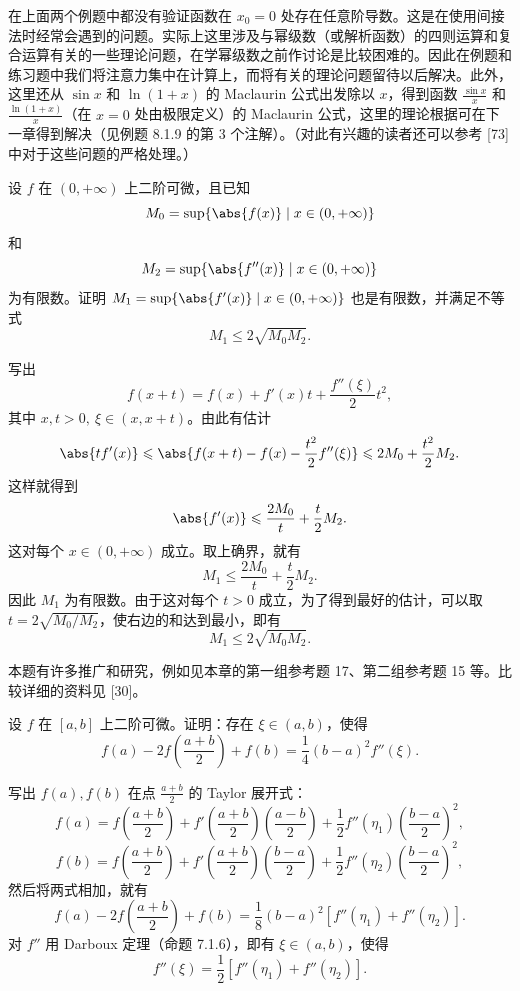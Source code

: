 \begin{xremark}
在上面两个例题中都没有验证函数在 $x_0=0$ 处存在任意阶导数。这是在使用间接法时经常会遇到的问题。实际上这里涉及与幂级数（或解析函数）的四则运算和复合运算有关的一些理论问题，在学幂级数之前作讨论是比较困难的。因此在例题和练习题中我们将注意力集中在计算上，而将有关的理论问题留待以后解决。此外，这里还从 $\sin x$ 和 $\ln(1+x)$ 的 Maclaurin 公式出发除以 $x$，得到函数 $\frac{\sin x}{x}$ 和 $\frac{\ln(1+x)}{x}$（在 $x=0$ 处由极限定义）的 Maclaurin 公式，这里的理论根据可在下一章得到解决（见例题 8.1.9 的第 3 个注解）。（对此有兴趣的读者还可以参考 [73] 中对于这些问题的严格处理。）
\end{xremark}

\begin{xexample}[7.2.5]
设 $f$ 在 $(0,+\infty)$ 上二阶可微，且已知
\[
  M_0=\sup\{\abs{f(x)}\mid x\in(0,+\infty)\}
\]
和
\[
  M_2=\sup\{\abs{f''(x)}\mid x\in(0,+\infty)\}
\]
为有限数。证明 $M_1=\sup\{\abs{f'(x)}\mid x\in(0,+\infty)\}$ 也是有限数，并满足不等式
\[
  M_1\leqslant2\sqrt{M_0M_2}.
\]
\end{xexample}
\begin{xproof}
写出
\[
  f(x+t)=f(x)+f'(x)t+\frac{f''(\xi)}{2}t^2,
\]
其中 $x,t>0,\ \xi\in(x,x+t)$。由此有估计
\[
  \abs{tf'(x)}\leqslant\abs{f(x+t)-f(x)-\frac{t^2}{2}f''(\xi)}
  \leqslant2M_0+\frac{t^2}{2}M_2.
\]
这样就得到
\[
  \abs{f'(x)}\leqslant\frac{2M_0}{t}+\frac{t}{2}M_2.
\]
这对每个 $x\in(0,+\infty)$ 成立。取上确界，就有
\begin{equation}
  M_1\leqslant\frac{2M_0}{t}+\frac{t}{2}M_2.
  \tag{7.24}
\end{equation}
因此 $M_1$ 为有限数。由于这对每个 $t>0$ 成立，为了得到最好的估计，可以取 $t=2\sqrt{M_0/M_2}$，使右边的和达到最小，即有
\[
  M_1\leqslant2\sqrt{M_0M_2}.
\]
\end{xproof}

\begin{xremark}
本题有许多推广和研究，例如见本章的第一组参考题 17、第二组参考题 15 等。比较详细的资料见 [30]。
\end{xremark}

\begin{xexample}[7.2.6]
设 $f$ 在 $[a,b]$ 上二阶可微。证明：存在 $\xi\in(a,b)$，使得
\[
  f(a)-2f\left(\frac{a+b}{2}\right)+f(b)=\frac14(b-a)^2f''(\xi).
\]
\end{xexample}
\begin{xproof}
写出 $f(a),f(b)$ 在点 $\frac{a+b}{2}$ 的 Taylor 展开式：
\[
  f(a)=f\left(\frac{a+b}{2}\right)
  +f'\left(\frac{a+b}{2}\right)\left(\frac{a-b}{2}\right)
  +\frac12f''(\eta_1)\left(\frac{b-a}{2}\right)^2,
\]
\[
  f(b)=f\left(\frac{a+b}{2}\right)
  +f'\left(\frac{a+b}{2}\right)\left(\frac{b-a}{2}\right)
  +\frac12f''(\eta_2)\left(\frac{b-a}{2}\right)^2,
\]
然后将两式相加，就有
\[
  f(a)-2f\left(\frac{a+b}{2}\right)+f(b)
  =\frac18(b-a)^2[f''(\eta_1)+f''(\eta_2)].
\]
对 $f''$ 用 Darboux 定理（命题 7.1.6），即有 $\xi\in(a,b)$，使得
\[
  f''(\xi)=\frac12[f''(\eta_1)+f''(\eta_2)].
\]
\end{xproof}

